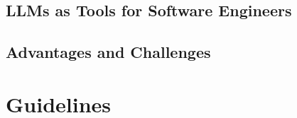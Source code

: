 









\subsection{LLMs as Tools for Software Engineers}
\label{sec:llms-as-tools-for-software-engineers}









\subsection{Advantages and Challenges}
\label{sec:advantages-challenges}



\section{Guidelines}
\label{sec:guidelines}



